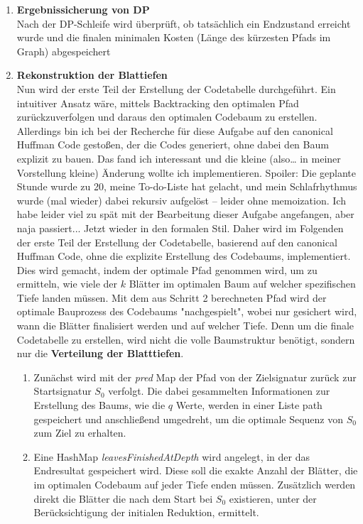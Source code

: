 \documentclass[a4paper,10pt,ngerman]{scrartcl}
\begin{document}
\begin{enumerate}
\begin{enumerate}
  \end{enumerate}
  \item \textbf{Ergebnissicherung von DP}\\
  Nach der DP-Schleife wird überprüft, ob tatsächlich ein Endzustand erreicht wurde und die finalen minimalen Kosten (Länge des kürzesten Pfads im Graph) abgespeichert 
  \item \textbf{Rekonstruktion der Blattiefen}\\
  Nun wird der erste Teil der Erstellung der Codetabelle durchgeführt. Ein intuitiver Ansatz wäre, mittels Backtracking den optimalen Pfad zurückzuverfolgen und daraus den optimalen Codebaum zu erstellen. Allerdings bin ich bei der Recherche für diese Aufgabe auf den canonical Huffman Code gestoßen, der die Codes generiert, ohne dabei den Baum explizit zu bauen. Das fand ich interessant und die kleine (also… in meiner Vorstellung kleine) Änderung wollte ich implementieren. Spoiler: Die geplante Stunde wurde zu 20, meine To-do-Liste hat gelacht, und mein Schlafrhythmus wurde (mal wieder) dabei rekursiv aufgelöst – leider ohne memoization. Ich habe leider viel zu spät mit der Bearbeitung dieser Aufgabe angefangen, aber naja passiert... Jetzt wieder in den formalen Stil. Daher wird im Folgenden der erste Teil der Erstellung der Codetabelle, basierend auf den canonical Huffman Code, ohne die explizite Erstellung des Codebaums, implementiert. Dies wird gemacht, indem der optimale Pfad genommen wird, um zu ermitteln, wie viele der $k$ Blätter im optimalen Baum auf welcher spezifischen Tiefe landen müssen. Mit dem aus Schritt 2 berechneten Pfad wird der optimale Bauprozess des Codebaums "nachgespielt", wobei nur gesichert wird, wann die Blätter finalisiert werden und auf welcher Tiefe. Denn um die finale Codetabelle zu erstellen, wird nicht die volle Baumstruktur benötigt, sondern nur die \textbf{Verteilung der Blatttiefen}.  
  \begin{enumerate}
    \item Zunächst wird mit der \textit{pred} Map der Pfad von der Zielsignatur zurück zur Startsignatur $S_0$ verfolgt. Die dabei gesammelten Informationen zur Erstellung des Baums, wie die $q$ Werte, werden in einer Liste path gespeichert und anschließend umgedreht, um die optimale Sequenz von $S_0$ zum Ziel zu erhalten. 
    \item Eine HashMap \textit{leavesFinishedAtDepth} wird angelegt, in der das Endresultat gespeichert wird. Diese soll die exakte Anzahl der Blätter, die im optimalen Codebaum auf jeder Tiefe enden müssen. Zusätzlich werden direkt die Blätter die nach dem Start bei $S_0$ existieren, unter der Berücksichtigung der initialen Reduktion, ermittelt. \\

\end{enumerate}
\end{enumerate}
\end{document}
